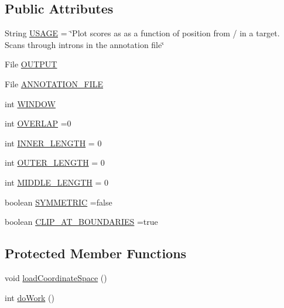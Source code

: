 \subsection*{Public Attributes}
\begin{DoxyCompactItemize}
\item 
String \hyperlink{classbroad_1_1pda_1_1seq_1_1rap_1_1_plot_aggregate_regions_a17a9394bebee8d684ea83e9f5291db04}{U\+S\+A\+G\+E} = \char`\"{}Plot scores as as a function of position from / in a target. Scans through introns in the annotation file\char`\"{}
\item 
File \hyperlink{classbroad_1_1pda_1_1seq_1_1rap_1_1_plot_aggregate_regions_a76e7c22fae964175b94fe9a0e1a58e11}{O\+U\+T\+P\+U\+T}
\item 
File \hyperlink{classbroad_1_1pda_1_1seq_1_1rap_1_1_plot_aggregate_regions_ad29d56e084c61c6c626f0ab18e448cfb}{A\+N\+N\+O\+T\+A\+T\+I\+O\+N\+\_\+\+F\+I\+L\+E}
\item 
int \hyperlink{classbroad_1_1pda_1_1seq_1_1rap_1_1_plot_aggregate_regions_aacd401af92a77873fbdd1b0f6f413618}{W\+I\+N\+D\+O\+W}
\item 
int \hyperlink{classbroad_1_1pda_1_1seq_1_1rap_1_1_plot_aggregate_regions_abe6dd43cd416938f073fea0fe5cfde68}{O\+V\+E\+R\+L\+A\+P} =0
\item 
int \hyperlink{classbroad_1_1pda_1_1seq_1_1rap_1_1_plot_aggregate_regions_a5f3aac602c678d4be45f0ea0a5d5480a}{I\+N\+N\+E\+R\+\_\+\+L\+E\+N\+G\+T\+H} = 0
\item 
int \hyperlink{classbroad_1_1pda_1_1seq_1_1rap_1_1_plot_aggregate_regions_abc7792e8b745c35886939c1ced417419}{O\+U\+T\+E\+R\+\_\+\+L\+E\+N\+G\+T\+H} = 0
\item 
int \hyperlink{classbroad_1_1pda_1_1seq_1_1rap_1_1_plot_aggregate_regions_a65e45f04b22570f40775230727515fc1}{M\+I\+D\+D\+L\+E\+\_\+\+L\+E\+N\+G\+T\+H} = 0
\item 
boolean \hyperlink{classbroad_1_1pda_1_1seq_1_1rap_1_1_plot_aggregate_regions_aa1d2c8bd57f485aba411349ab9b68248}{S\+Y\+M\+M\+E\+T\+R\+I\+C} =false
\item 
boolean \hyperlink{classbroad_1_1pda_1_1seq_1_1rap_1_1_plot_aggregate_regions_a4407dcbebaf7f056ee5f1991bfad1a4a}{C\+L\+I\+P\+\_\+\+A\+T\+\_\+\+B\+O\+U\+N\+D\+A\+R\+I\+E\+S} =true
\end{DoxyCompactItemize}
\subsection*{Protected Member Functions}
\begin{DoxyCompactItemize}
\item 
void \hyperlink{classbroad_1_1pda_1_1seq_1_1rap_1_1_plot_aggregate_regions_a45b90202890628d8bbdb0f39f2ff73f0}{load\+Coordinate\+Space} ()
\item 
int \hyperlink{classbroad_1_1pda_1_1seq_1_1rap_1_1_plot_aggregate_regions_a4369c164ec6a94743373b8be8ad610d7}{do\+Work} ()
\end{DoxyCompactItemize}
